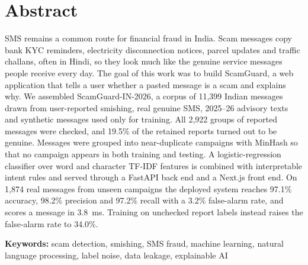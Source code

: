 \documentclass[12pt,a4paper]{report}
\begin{document}
\chapter{Abstract}
SMS remains a common route for financial fraud in India. Scam messages copy bank KYC reminders, electricity disconnection notices, parcel updates and traffic challans, often in Hindi, so they look much like the genuine service messages people receive every day. The goal of this work was to build ScamGuard, a web application that tells a user whether a pasted message is a scam and explains why. We assembled ScamGuard-IN-2026, a corpus of 11,399 Indian messages drawn from user-reported smishing, real genuine SMS, 2025--26 advisory texts and synthetic messages used only for training. All 2,922 groups of reported messages were checked, and 19.5\% of the retained reports turned out to be genuine. Messages were grouped into near-duplicate campaigns with MinHash so that no campaign appears in both training and testing. A logistic-regression classifier over word and character TF-IDF features is combined with interpretable intent rules and served through a FastAPI back end and a Next.js front end. On 1,874 real messages from unseen campaigns the deployed system reaches 97.1\% accuracy, 98.2\% precision and 97.2\% recall with a 3.2\% false-alarm rate, and scores a message in 3.8~ms. Training on unchecked report labels instead raises the false-alarm rate to 34.0\%.

\vspace{0.3cm}\noindent\textbf{Keywords:} scam detection, smishing, SMS fraud, machine learning, natural language processing, label noise, data leakage, explainable AI

\end{document}
